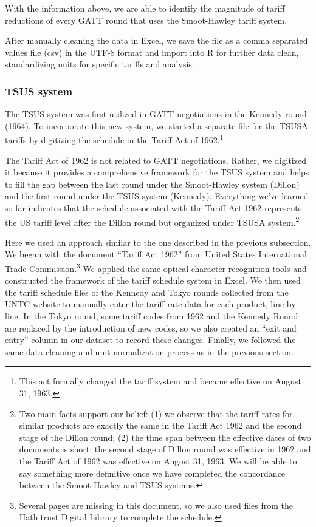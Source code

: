 \documentclass[
  12pt,
]{article}
\begin{document}
With the information above, we are able to identify the magnitude of tariff reductions of every GATT round that uses the Smoot-Hawley tariff system.

After manually cleaning the data in Excel, we save the file as a comma separated values file (csv) in the UTF-8 format and import into R for further data clean, standardizing units for specific tariffs and analysis.

\hypertarget{tsus-system}{%
\subsubsection{TSUS system}\label{tsus-system}}

The TSUS system was first utilized in GATT negotiations in the Kennedy round (1964). To incorporate this new system, we started a separate file for the TSUSA tariffs by digitizing the schedule in the Tariff Act of 1962.\footnote{This act formally changed the tariff system and became effective on August 31, 1963.}

The Tariff Act of 1962 is not related to GATT negotiations. Rather, we digitized it because it provides a comprehensive framework for the TSUS system and helps to fill the gap between the last round under the Smoot-Hawley system (Dillon) and the first round under the TSUS system (Kennedy). Everything we've learned so far indicates that the schedule associated with the Tariff Act 1962 represents the US tariff level after the Dillon round but organized under TSUSA system.\footnote{Two main facts support our belief: (1) we observe that the tariff rates for similar products are exactly the same in the Tariff Act 1962 and the second stage of the Dillon round; (2) the time span between the effective dates of two documents is short: the second stage of Dillon round was effective in 1962 and the Tariff Act of 1962 was effective on August 31, 1963. We will be able to say something more definitive once we have completed the concordance between the Smoot-Hawley and TSUS systems.}

Here we used an approach similar to the one described in the previous subsection. We began with the document ``Tariff Act 1962'' from United States International Trade Commission.\footnote{Several pages are missing in this document, so we also used files from the Hathitrust Digital Library to complete the schedule.} We applied the same optical character recognition tools and constructed the framework of the tariff schedule system in Excel. We then used the tariff schedule files of the Kennedy and Tokyo rounds collected from the UNTC website to manually enter the tariff rate data for each product, line by line. In the Tokyo round, some tariff codes from 1962 and the Kennedy Round are replaced by the introduction of new codes, so we also created an ``exit and entry'' column in our dataset to record these changes. Finally, we followed the same data cleaning and unit-normalization process as in the previous section.
\end{document}
